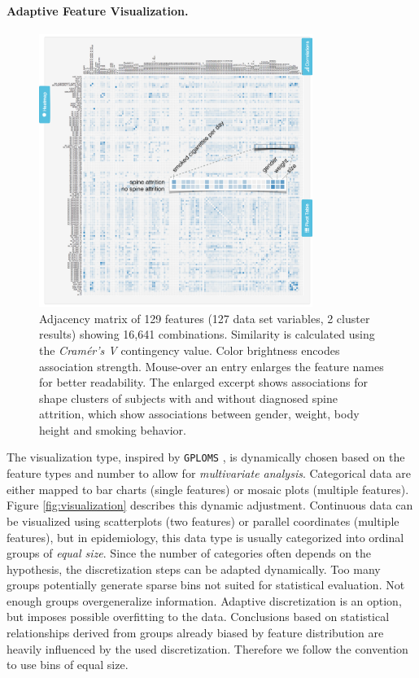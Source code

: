 \documentclass[journal]{style/vgtc} 			          %
\begin{document}
\paragraph{Adaptive Feature Visualization.} \label{sec:AdaptiveFeatureVisualization}
\begin{figure}[htb]
 \centering
 \includegraphics[width=3.5in]{figures/similarity_matrix}
 \caption{Adjacency matrix of 129 features (127 data set variables, 2 cluster results) showing 16,641 combinations.
 Similarity is calculated using the \emph{Cram\'{e}r's V} contingency value.
 Color brightness encodes association strength.
 Mouse-over an entry enlarges the feature names for better readability.
 The enlarged excerpt shows associations for shape clusters of subjects with and without diagnosed spine attrition, which show associations between gender, weight, body height and smoking behavior.
 }
 \label{fig:similarity}
\end{figure}
The visualization type, inspired by \texttt{GPLOMS} \cite{GPLOMS, Francois2013}, is dynamically chosen based on the feature types and number to allow for \emph{multivariate analysis}.
%
Categorical data are either mapped to bar charts (single features) or mosaic plots (multiple features).
%
Figure \ref{fig:visualization} describes this dynamic adjustment.
%
Continuous data can be visualized using scatterplots (two features) or parallel coordinates (multiple features), but in epidemiology, this data type is usually categorized into ordinal groups of \emph{equal size}.
%
Since the number of categories often depends on the hypothesis, the discretization steps can be adapted dynamically.
%
Too many groups potentially generate sparse bins not suited for statistical evaluation.
%
Not enough groups overgeneralize information.
%
Adaptive discretization is an option, but imposes possible overfitting to the data.
%
Conclusions based on statistical relationships derived from groups already biased by feature distribution are heavily influenced by the used discretization.
%
Therefore we follow the convention to use bins of equal size.
\end{document}
